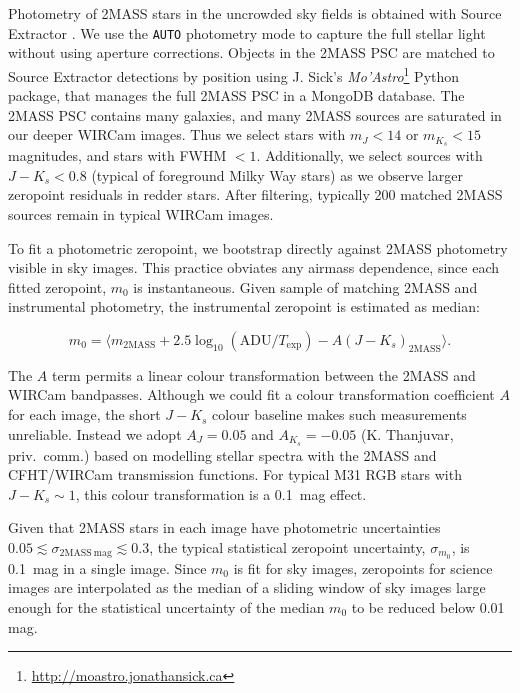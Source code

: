 \documentclass[iop]{emulateapj}
\newcommand{\sw}[1]{\textit{#1}} %
\begin{document}
Photometry of 2MASS stars in the uncrowded sky fields is obtained with Source Extractor \citep{Bertin:1996}.
We use the \texttt{AUTO} photometry mode to capture the full stellar light without using aperture corrections.
Objects in the 2MASS PSC are matched to Source Extractor detections by position using J. Sick's \sw{Mo'Astro}\footnote{\url{http://moastro.jonathansick.ca}} Python package, that manages the full 2MASS PSC in a MongoDB database.
The 2MASS PSC contains many galaxies, and many 2MASS sources are saturated in our deeper WIRCam images.
Thus we select stars with $m_J < 14$ or $m_{K_s} < 15$ magnitudes, and stars with FWHM $<1$\arcsec.
Additionally, we select sources with $J-K_s < 0.8$ (typical of foreground Milky Way stars) as we observe larger zeropoint residuals in redder stars.
After filtering, typically 200 matched 2MASS sources remain in typical WIRCam images.

To fit a photometric zeropoint, we bootstrap directly against 2MASS photometry visible in sky images.
This practice obviates any airmass dependence, since each fitted zeropoint, $m_0$ is instantaneous.
Given sample of matching 2MASS and instrumental photometry, the instrumental zeropoint is estimated as median:

\begin{equation}
  \label{eq:photcal}
  m_0 = \langle m_\mathrm{2MASS} + 2.5 \log_{10}(\mathrm{ADU}/T_\mathrm{exp}) - A (J-K_s)_\mathrm{2MASS} \rangle.
\end{equation}

The $A$ term permits a linear colour transformation between the 2MASS and WIRCam bandpasses.
Although we could fit a colour transformation coefficient $A$ for each image, the short $J-K_s$ colour baseline makes such measurements unreliable.
Instead we adopt $A_J = 0.05$ and $A_{K_s} = -0.05$ (K. Thanjuvar, priv.\ comm.) based on modelling stellar spectra with the 2MASS and CFHT/WIRCam transmission functions.
For typical M31 RGB stars with $J-K_s\sim 1$, this colour transformation is a 0.1~mag effect.

Given that 2MASS stars in each image have photometric uncertainties $0.05 \lesssim \sigma_{\mathrm{2MASS~mag}} \lesssim 0.3$, the typical statistical zeropoint uncertainty, $\sigma_{m_0}$, is 0.1~mag in a single image.
Since $m_0$ is fit for sky images, zeropoints for science images are interpolated as the median of a sliding window of sky images large enough for the statistical uncertainty of the median $m_0$ to be reduced below 0.01 mag.
\end{document}
